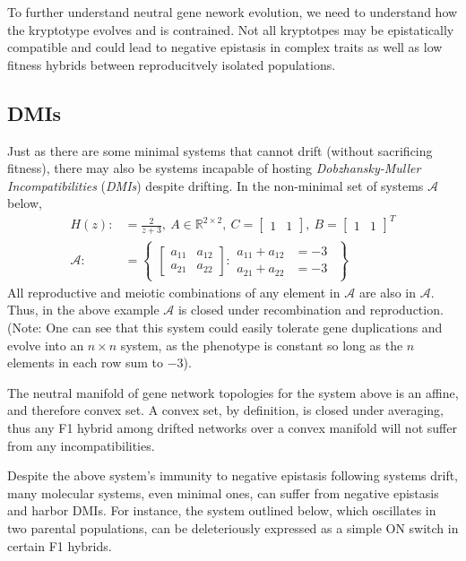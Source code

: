 \documentclass[11 pt]{article}
\newcommand{\A}{\mathcal{A}}
\newcommand{\1}{\mathbbm{1}}
\begin{document}
   To further understand neutral gene nework evolution, we need to understand how the kryptotype evolves and is contrained. Not all kryptotpes may be epistatically compatible and could lead to negative epistasis in complex traits as well as low fitness hybrids between reproducitvely isolated populations.

   \subsection{DMIs}
   Just as there are some minimal systems that cannot drift (without sacrificing fitness), there may also be systems incapable of hosting \emph{Dobzhansky-Muller Incompatibilities} (\emph{DMIs}) despite drifting.
   In the non-minimal set of systems $\A$ below,
   \begin{align*}
     H(z) :&= \frac{2}{z+3} , \ A \in \mathbb{R}^{2 \times 2}, \ C = \begin{bmatrix} 1 & 1 \end{bmatrix}, \ B = \begin{bmatrix} 1 & 1 \end{bmatrix}^{T} \\
      \A :&= \left\{ \begin{array}{cc} \left[ \begin{array}{cc} a_{11} & a_{12} \\ a_{21} & a_{22} \end{array} \right] : \begin{array}{cc} a_{11} + a_{12} &= -3 \\
   a_{21} + a_{22} &= -3 \end{array} \end{array} \right\}
   \end{align*}
   All reproductive and meiotic combinations of any element in $\A$ are also in $\A$. Thus, in the above example $\A$ is closed under recombination and reproduction. (Note: One can see that this system could easily tolerate gene duplications and evolve into an $n \times n$ system, as the phenotype is constant so long as the $n$ elements in each row sum to $-3$).

   The neutral manifold of gene network topologies for the system above is an affine, and therefore convex set. A convex set, by definition, is closed under averaging, thus any F1 hybrid among drifted networks over a convex manifold will not suffer from any incompatibilities.

   Despite the above system's immunity to negative epistasis following systems drift, many molecular systems, even minimal ones, can suffer from negative epistasis and harbor DMIs.
   For instance, the system outlined below, which oscillates in two parental populations, can be deleteriously expressed as a simple ON switch in certain F1 hybrids.
\end{document}
